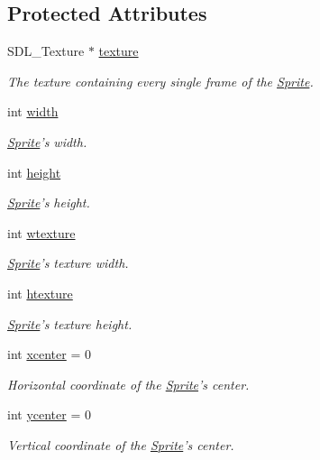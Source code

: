 \subsection*{Protected Attributes}
\begin{DoxyCompactItemize}
\item 
S\-D\-L\-\_\-\-Texture $\ast$ \hyperlink{class_sprite_a531ed274733d916261f49e1a2cbb6ba9}{texture}
\begin{DoxyCompactList}\small\item\em The texture containing every single frame of the \hyperlink{class_sprite}{Sprite}. \end{DoxyCompactList}\item 
int \hyperlink{class_sprite_a0a3364944c5e361fc9e7ae406224d682}{width}
\begin{DoxyCompactList}\small\item\em \hyperlink{class_sprite}{Sprite}'s width. \end{DoxyCompactList}\item 
int \hyperlink{class_sprite_a1f07c8f2080c193759aec0e13503d7ab}{height}
\begin{DoxyCompactList}\small\item\em \hyperlink{class_sprite}{Sprite}'s height. \end{DoxyCompactList}\item 
int \hyperlink{class_sprite_a342df27bc7e10f79c0bc4d89689e5bfe}{wtexture}
\begin{DoxyCompactList}\small\item\em \hyperlink{class_sprite}{Sprite}'s texture width. \end{DoxyCompactList}\item 
int \hyperlink{class_sprite_afa90435f9d50265180a80399fda091d1}{htexture}
\begin{DoxyCompactList}\small\item\em \hyperlink{class_sprite}{Sprite}'s texture height. \end{DoxyCompactList}\item 
int \hyperlink{class_sprite_a4fc7935f0e4e38f0960a412293c87ab2}{xcenter} = 0
\begin{DoxyCompactList}\small\item\em Horizontal coordinate of the \hyperlink{class_sprite}{Sprite}'s center. \end{DoxyCompactList}\item 
int \hyperlink{class_sprite_a5b63544c1057e1d90ccb4fb573e6db27}{ycenter} = 0
\begin{DoxyCompactList}\small\item\em Vertical coordinate of the \hyperlink{class_sprite}{Sprite}'s center. \end{DoxyCompactList}\item 

\end{DoxyCompactItemize}
